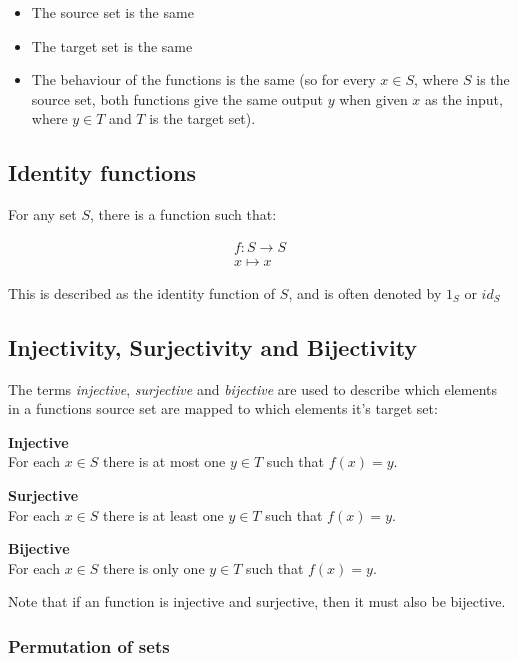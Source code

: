 \begin{itemize}
	\item The source set is the same
	\item The target set is the same
	\item The behaviour of the functions is the same (so for every $x \in S$, 
		  where $S$ is the source set, both functions give the same output $y$
		  when given $x$ as the input, where $y \in T$ and $T$ is the target
		  set).
\end{itemize}

\subsection{Identity functions}

For any set $S$, there is a function such that:

\[
	\begin{split}
	f:S \rightarrow S\\
	x \longmapsto x
	\end{split}
\]	

This is described as the identity function of $S$, and is often denoted by $1_S$
or $id_S$

\subsection{Injectivity, Surjectivity and Bijectivity}

The terms {\it injective}, {\it surjective} and {\it bijective} are used to
describe which elements in a functions source set are mapped to which elements
it's target set:

\begin{description}
	\item {\bf Injective}\\
		For each $x \in S$ there is at most one $y \in T$ such that $f(x) = y$.
	\item {\bf Surjective}\\
		For each $x \in S$ there is at least one $y \in T$ such that $f(x) = y$.
	\item {\bf Bijective}\\
		For each $x \in S$ there is only one $y \in T$ such that $f(x) = y$.
\end{description}

Note that if an function is injective and surjective, then it must also be
bijective.

\subsubsection{Permutation of sets}

